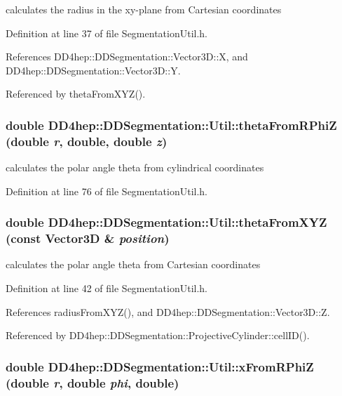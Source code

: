 calculates the radius in the xy-\/plane from Cartesian coordinates 

Definition at line 37 of file SegmentationUtil.h.

References DD4hep::DDSegmentation::Vector3D::X, and DD4hep::DDSegmentation::Vector3D::Y.

Referenced by thetaFromXYZ().\hypertarget{namespace_d_d4hep_1_1_d_d_segmentation_1_1_util_a810a2371a6bb37d88321f100026f35c3}{
\subsubsection[{thetaFromRPhiZ}]{\setlength{\rightskip}{0pt plus 5cm}double DD4hep::DDSegmentation::Util::thetaFromRPhiZ (double {\em r}, \/  double, \/  double {\em z})}}
\label{namespace_d_d4hep_1_1_d_d_segmentation_1_1_util_a810a2371a6bb37d88321f100026f35c3}


calculates the polar angle theta from cylindrical coordinates 

Definition at line 76 of file SegmentationUtil.h.\hypertarget{namespace_d_d4hep_1_1_d_d_segmentation_1_1_util_a91c9acb845023538b301430609481e0e}{
\subsubsection[{thetaFromXYZ}]{\setlength{\rightskip}{0pt plus 5cm}double DD4hep::DDSegmentation::Util::thetaFromXYZ (const Vector3D \& {\em position})}}
\label{namespace_d_d4hep_1_1_d_d_segmentation_1_1_util_a91c9acb845023538b301430609481e0e}


calculates the polar angle theta from Cartesian coordinates 

Definition at line 42 of file SegmentationUtil.h.

References radiusFromXYZ(), and DD4hep::DDSegmentation::Vector3D::Z.

Referenced by DD4hep::DDSegmentation::ProjectiveCylinder::cellID().\hypertarget{namespace_d_d4hep_1_1_d_d_segmentation_1_1_util_aef69bb74835c52ef738740d16db3343e}{
\subsubsection[{xFromRPhiZ}]{\setlength{\rightskip}{0pt plus 5cm}double DD4hep::DDSegmentation::Util::xFromRPhiZ (double {\em r}, \/  double {\em phi}, \/  double)}}
\label{namespace_d_d4hep_1_1_d_d_segmentation_1_1_util_aef69bb74835c52ef738740d16db3343e}


